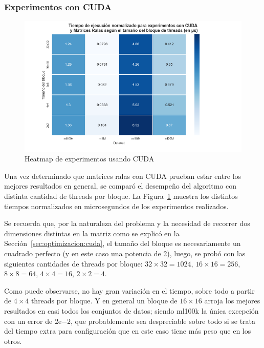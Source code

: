 \documentclass[11pt, a4paper]{article}
\begin{document}
  \subsubsection{Experimentos con CUDA}

  \begin{figure}[ht]
    \centering
    \includegraphics[width=\textwidth]{plots/cuda_sparse_blocks.png}
      \caption{Heatmap de experimentos usando CUDA}\label{fig:heatmap:cuda}
  \end{figure}

  Una vez determinado que matrices ralas con CUDA prueban estar entre los
  mejores resultados en general, se comparó el desempeño del algoritmo con
  distinta cantidad de threads por bloque. La Figura~\ref{fig:heatmap:cuda}
  muestra los distintos tiempos normalizados en microsegundos de los
  experimentos realizados.

  Se recuerda que, por la naturaleza del problema y la necesidad de recorrer
  dos dimensiones distintas en la matriz como se explicó en la
  Sección~\ref{sec:optimizacion:cuda}, el tamaño del bloque es necesariamente
  un cuadrado perfecto (y en este caso una potencia de 2), luego, se probó con
  las siguientes cantidades de threads por bloque: $32\times32=1024$,
  $16\times16=256$, $8\times8=64$, $4\times4=16$, $2\times2=4$.

  Como puede observarse, no hay gran variación en el tiempo, sobre todo a
  partir de $4\times4$ threads por bloque. Y en general un bloque de
  $16\times16$ arroja los mejores resultados en casi todos los conjuntos de
  datos; siendo ml100k la única excepción con un error de $2\mathrm{e}{-2}$,
  que probablemente sea despreciable sobre todo si se trata del tiempo extra
  para configuración que en este caso tiene más peso que en los otros.
\end{document}
